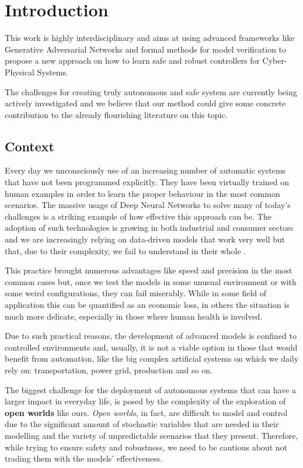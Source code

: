 \chapter{Introduction}

This work is highly interdisciplinary and aims at using advanced frameworks like Generative Adversarial Networks and formal methods for model verification to propose a new approach on how to learn safe and robust controllers for Cyber-Physical Systems.

The challenges for creating truly autonomous and safe system are currently being actively investigated and we believe that our method could give some concrete contribution to the already flourishing literature on this topic.


\section{Context}
Every day we unconsciously use of an increasing number of automatic systems that have not been programmed explicitly.
They have been virtually trained on human examples in order to learn the proper behaviour in the most common scenarios.
The massive usage of Deep Neural Networks to solve many of today's challenges \cite{Dargan_Kumar_Ayyagari_Kumar_2019} is a striking example of how effective this approach can be.
The adoption of such technologies is growing in both industrial and consumer sectors and we are increasingly relying on data-driven models that work very well but that, due to their complexity, we fail to understand in their whole \cite{Carvalho_Pereira_Cardoso_2019}.

This practice brought numerous advantages like speed and precision in the most common cases but, once we test the models in some unusual environment or with some weird configurations, they can fail miserably.
While in some field of application this can be quantified as an economic loss, in others the situation is much more delicate, especially in those where human health is involved.

Due to such practical reasons, the development of advanced models is confined to controlled environments and, usually, it is not a viable option in those that would benefit from automation, like the big complex artificial systems on which we daily rely on: transportation, power grid, production and so on.

The biggest challenge for the deployment of autonomous systems that can have a larger impact in everyday life, is posed by the complexity of the exploration of \textbf{open worlds} like ours.
\textit{Open worlds}, in fact, are difficult to model and control due to the significant amount of stochastic variables that are needed in their modelling and the variety of unpredictable scenarios that they present.
Therefore, while trying to ensure safety and robustness, we need to be cautious about not trading them with the models' effectiveness.


